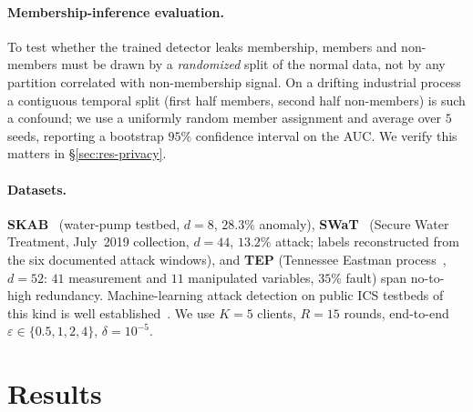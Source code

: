 \documentclass[pdflatex,sn-mathphys-num]{sn-jnl}
\theoremstyle{thmstyleone}
\theoremstyle{thmstyletwo}
\theoremstyle{thmstylethree}
\begin{document}
\paragraph{Membership-inference evaluation.} To test whether the trained detector
leaks membership, members and non-members must be drawn by a \emph{randomized} split
of the normal data, not by any partition correlated with non-membership signal. On a
drifting industrial process a contiguous temporal split (first half members, second
half non-members) is such a confound; we use a uniformly random member assignment and
average over $5$ seeds, reporting a bootstrap $95\%$ confidence interval on the AUC.
We verify this matters in \S\ref{sec:res-privacy}.

\paragraph{Datasets.} \textbf{SKAB}~\cite{katser2020skab} (water-pump testbed,
$d{=}8$, $28.3\%$ anomaly), \textbf{SWaT}~\cite{mathur2016swat,goh2016swat}
(Secure Water Treatment, July~2019 collection, $d{=}44$, $13.2\%$ attack; labels
reconstructed from the six documented attack windows), and \textbf{TEP}
(Tennessee Eastman process~\cite{downs1993tep,rieth2017tep}, $d{=}52$: $41$
measurement and $11$ manipulated variables, $35\%$ fault) span no-to-high
redundancy. Machine-learning attack detection on public ICS testbeds of this kind is
well established~\cite{mubarak2022industrial}. We use $K{=}5$ clients, $R{=}15$ rounds,
end-to-end $\varepsilon\in\{0.5,1,2,4\}$, $\delta{=}10^{-5}$.

\section{Results}\label{sec:results}
\end{document}
